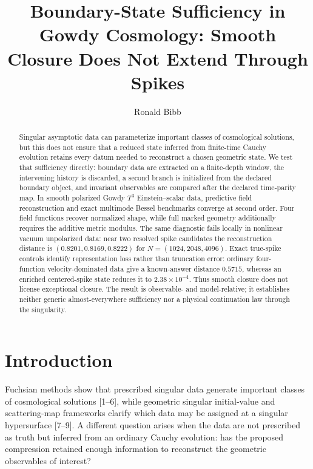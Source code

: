 \documentclass{iopjournal}
\begin{document}
\title{Boundary-State Sufficiency in Gowdy Cosmology: Smooth Closure Does Not Extend Through Spikes}
\author{Ronald Bibb}
\par\noindent{}\par

\begin{abstract}
Singular asymptotic data can parameterize important classes of cosmological solutions, but this does not ensure that a reduced state inferred from finite-time Cauchy evolution retains every datum needed to reconstruct a chosen geometric state. We test that sufficiency directly: boundary data are extracted on a finite-depth window, the intervening history is discarded, a second branch is initialized from the declared boundary object, and invariant observables are compared after the declared time-parity map. In smooth polarized Gowdy $T^3$ Einstein--scalar data, predictive field reconstruction and exact multimode Bessel benchmarks converge at second order. Four field functions recover normalized shape, while full marked geometry additionally requires the additive metric modulus. The same diagnostic fails locally in nonlinear vacuum unpolarized data: near two resolved spike candidates the reconstruction distance is $(0.8201,0.8169,0.8222)$ for $N=(1024,2048,4096)$. Exact true-spike controls identify representation loss rather than truncation error: ordinary four-function velocity-dominated data give a known-answer distance $0.5715$, whereas an enriched centered-spike state reduces it to $2.38\times10^{-4}$. Thus smooth closure does not license exceptional closure. The result is observable- and model-relative; it establishes neither generic almost-everywhere sufficiency nor a physical continuation law through the singularity.
\end{abstract}

\section{Introduction}
Fuchsian methods show that prescribed singular data generate important classes of cosmological solutions [1--6], while geometric singular initial-value and scattering-map frameworks clarify which data may be assigned at a singular hypersurface [7--9]. A different question arises when the data are not prescribed as truth but inferred from an ordinary Cauchy evolution: has the proposed compression retained enough information to reconstruct the geometric observables of interest?
\end{document}
